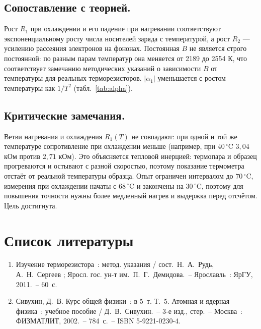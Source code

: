 \documentclass[12pt, a4paper]{article}
\begin{document}
	\subsection*{Сопоставление с теорией.}
	Рост $R_1$ при охлаждении и его падение при нагревании соответствуют экспоненциальному росту числа носителей заряда с температурой, а рост $R_2$ --- усилению рассеяния электронов на фононах. Постоянная $B$ не является строго постоянной: по разным парам температур она меняется от 2189 до 2554 К, что соответствует замечанию методических указаний о зависимости $B$ от температуры для реальных терморезисторов. $|\alpha_1|$ уменьшается с ростом температуры как $1/T^2$ (табл.~\ref{tab:alpha}).
	
	\newpage
	\subsection*{Критические замечания.}
	Ветви нагревания и охлаждения $R_1(T)$ не совпадают: при одной и той же температуре сопротивление при охлаждении меньше (например, при $40\,^\circ$C $3{,}04$ кОм против $2{,}71$ кОм). Это объясняется тепловой инерцией: термопара и образец прогреваются и остывают с разной скоростью, поэтому показание термометра отстаёт от реальной температуры образца. Опыт ограничен интервалом до $70\,^\circ$C, измерения при охлаждении начаты с $68\,^\circ$C и закончены на $30\,^\circ$C, поэтому для повышения точности нужны более медленный нагрев и выдержка перед отсчётом. Цель достигнута.
	
	\newpage
	\section*{Список литературы}
	
	\begin{enumerate}
		\item Изучение терморезистора~: метод. указания / сост.~Н.~А.~Рудь, А.~Н.~Сергеев ; Яросл. гос. ун-т им.~П.~Г.~Демидова.~-- Ярославль~: ЯрГУ, 2011.~-- 60~с.
		\item Сивухин, Д.~В. Курс общей физики~: в 5~т. Т.~5. Атомная и ядерная физика~: учебное пособие / Д.~В.~Сивухин.~-- 3-е изд., стер.~-- Москва~: ФИЗМАТЛИТ, 2002.~-- 784~с.~-- ISBN 5-9221-0230-4.
	\end{enumerate}
	
\end{document}
